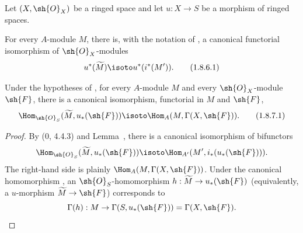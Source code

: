 \begin{corollary}[1.8.6]
\label{ega2:addendum:I.1.8.6}
Let $(X,\sh{O}_X)$ be a ringed space and let $u:X\to S$ be a morphism
of ringed spaces.

For every $A$-module $M$, there is, with the notation of
, a canonical functorial isomorphism of
$\sh{O}_X$-modules
\begin{equation}
\label{ega2:addendum:I.1.8.6.1}
  u^*(\widetilde M)\isoto u^*(i^*(M')).
\tag{1.8.6.1}
\end{equation}
\end{corollary}

\begin{corollary}[1.8.7]
\label{ega2:addendum:I.1.8.7}
Under the hypotheses of , for every $A$-module $M$ and
every $\sh{O}_X$-module $\sh{F}$, there is a canonical isomorphism,
functorial in $M$ and $\sh{F}$,
\begin{equation}
\label{ega2:addendum:I.1.8.7.1}
  \Hom_{\sh{O}_S}(\widetilde M,u_*(\sh{F}))
  \isoto\Hom_A(M,\Gamma(X,\sh{F})).
\tag{1.8.7.1}
\end{equation}
\end{corollary}

\begin{proof}
By (0, 4.4.3) and Lemma~, there is a canonical
isomorphism of bifunctors
\[
  \Hom_{\sh{O}_S}(\widetilde M,u_*(\sh{F}))
  \isoto\Hom_{A'}(M',i_*(u_*(\sh{F}))).
\]
The right-hand side is plainly $\Hom_A(M,\Gamma(X,\sh{F}))$.  Under
the canonical homomorphism , an
$\sh{O}_S$-homomorphism
$h:\widetilde M\to u_*(\sh{F})$ (equivalently, a $u$-morphism
$\widetilde M\to\sh{F}$) corresponds to
\[
  \Gamma(h):M\to\Gamma(S,u_*(\sh{F}))=\Gamma(X,\sh{F}).
\]
\end{proof}

